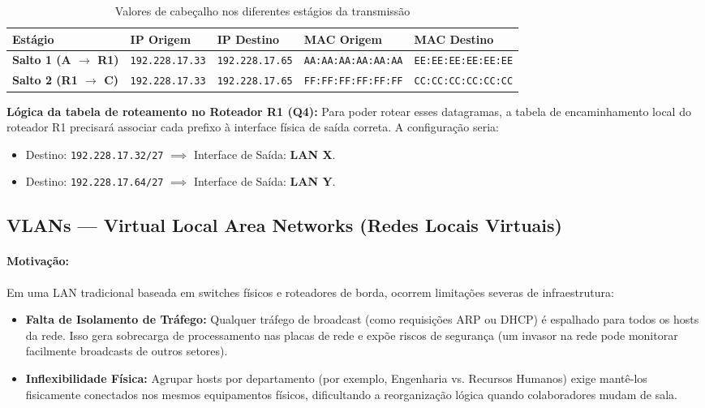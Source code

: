 \documentclass[11pt,a4paper]{article}
\begin{document}
\begin{table}[h!]
\centering
\caption{Valores de cabeçalho nos diferentes estágios da transmissão}
\label{tab:cabecalhos_salto}
\begin{tabularx}{\textwidth}{lXXXX}
\toprule
\textbf{Estágio} & \textbf{IP Origem} & \textbf{IP Destino} & \textbf{MAC Origem} & \textbf{MAC Destino} \\
\midrule
\textbf{Salto 1 (A $\to$ R1)} & \texttt{192.228.17.33} & \texttt{192.228.17.65} & \texttt{AA:AA:AA:AA:AA:AA} & \texttt{EE:EE:EE:EE:EE:EE} \\
\textbf{Salto 2 (R1 $\to$ C)} & \texttt{192.228.17.33} & \texttt{192.228.17.65} & \texttt{FF:FF:FF:FF:FF:FF} & \texttt{CC:CC:CC:CC:CC:CC} \\
\bottomrule
\end{tabularx}
\end{table}

\begin{pratico}
\textbf{Lógica da tabela de roteamento no Roteador R1 (Q4):}
Para poder rotear esses datagramas, a tabela de encaminhamento local do roteador R1 precisará associar cada prefixo à interface física de saída correta. A configuração seria:
\begin{itemize}
    \item Destino: \texttt{192.228.17.32/27} $\implies$ Interface de Saída: \textbf{LAN X}.
    \item Destino: \texttt{192.228.17.64/27} $\implies$ Interface de Saída: \textbf{LAN Y}.
\end{itemize}
\end{pratico}

\subsection{VLANs --- Virtual Local Area Networks (Redes Locais Virtuais)}

\paragraph{Motivação:}
Em uma LAN tradicional baseada em switches físicos e roteadores de borda, ocorrem limitações severas de infraestrutura:
\begin{itemize}
    \item \textbf{Falta de Isolamento de Tráfego:} Qualquer tráfego de broadcast (como requisições ARP ou DHCP) é espalhado para todos os hosts da rede. Isso gera sobrecarga de processamento nas placas de rede e expõe riscos de segurança (um invasor na rede pode monitorar facilmente broadcasts de outros setores).
    \item \textbf{Inflexibilidade Física:} Agrupar hosts por departamento (por exemplo, Engenharia vs. Recursos Humanos) exige mantê-los fisicamente conectados nos mesmos equipamentos físicos, dificultando a reorganização lógica quando colaboradores mudam de sala.
\end{itemize}
\end{document}

